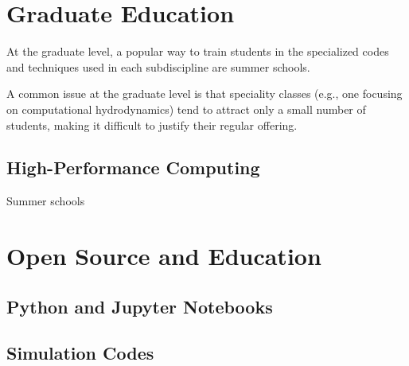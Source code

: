 \documentclass[11pt]{article}
\begin{document}
\section{Graduate Education}

At the graduate level, a popular way to train students in the specialized
codes and techniques used in each subdiscipline are summer schools.

A common issue at the graduate level is that speciality classes (e.g.,
one focusing on computational hydrodynamics) tend to attract only a
small number of students, making it difficult to justify their regular
offering.

\subsection{High-Performance Computing}

Summer schools


\section{Open Source and Education}

\subsection{Python and Jupyter Notebooks}

\subsection{Simulation Codes}
\end{document}
